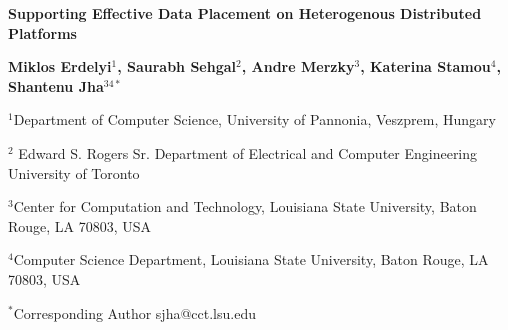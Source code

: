 \documentclass[a4paper,11pt]{article}
\begin{document}
\begin{center}
\textbf {\Large \bf Supporting Effective Data Placement on Heterogenous Distributed Platforms}

\textbf {\normalsize \hspace{0.6 in} Miklos Erdelyi$^1$, Saurabh Sehgal$^2$, Andre Merzky$^3$,  \newline Katerina Stamou$^4$, Shantenu Jha$^{34*}$ }

\normalsize { \hspace{0.6 in} $^1$Department of Computer Science, University of Pannonia, Veszprem, Hungary}

\normalsize { \hspace{0.6 in} $^2$ Edward S. Rogers Sr. Department of Electrical and Computer Engineering  University of Toronto}

\normalsize { \hspace{0.6 in} $^3$Center for Computation and Technology, \newline Louisiana State University, Baton Rouge, LA 70803, USA}

\normalsize {\hspace{0.6 in} $^4$Computer Science Department, \newline Louisiana State University, Baton Rouge, LA 70803, USA}

{\footnotesize {\hspace{0.0 in} $^*$Corresponding Author sjha@cct.lsu.edu}}

\end{center}

\end{document}
